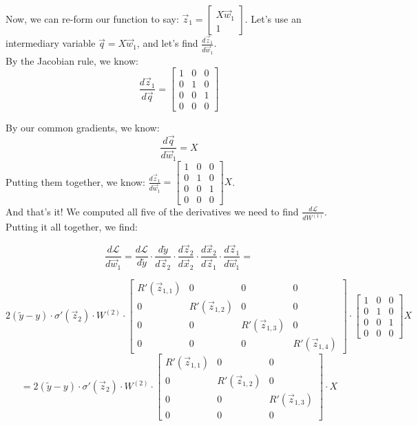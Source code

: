 \documentclass{article}
\begin{document}
Now, we can re-form our function to say: $\vec{z}_1 = \begin{bmatrix}X \vec{w}_1 \\ 1\end{bmatrix}$. Let's use an intermediary variable $\vec{q} = X \vec{w}_1$, and let's find $\frac{d\vec{z}_1}{d\vec{w}_1}$. \\

By the Jacobian rule, we know: $$\frac{d \vec{z}_1}{d \vec{q}} = \begin{bmatrix} 1 & 0 & 0 \\ 0 & 1 & 0 \\ 0 & 0 & 1 \\ 0 & 0 & 0\end{bmatrix}$$

By our common gradients, we know: $$\frac{d \vec{q}}{d \vec{w}_1} = X$$ Putting them together, we know:
$\frac{d \vec{z}_1}{d \vec{w}_1} = \begin{bmatrix} 1 & 0 & 0 \\ 0 & 1 & 0 \\ 0 & 0 & 1 \\ 0 & 0 & 0\end{bmatrix} X$. \\

And that's it! We computed all five of the derivatives we need to find $\frac{d \mathcal{L}}{d W^{(1)}}$. Putting it all together, we find:

\[\frac{d\mathcal{L}}{d \vec{w}_1} = \frac{d\mathcal{L}}{d \tilde{y}} \cdot \frac{d\tilde{y}}{d\vec{z}_2} \cdot \frac{d\vec{z}_2}{d \vec{x}_2} \cdot \frac{d\vec{x}_2}{d\vec{z}_1}\cdot \frac{d\vec{z}_1}{d \vec{w}_1} = \] 

\[2 (\tilde{y} - y) \cdot \sigma'(\vec{z}_2) \cdot W^{(2)} \cdot \begin{bmatrix}R'(\vec{z}_{1, 1}) & 0 & 0 & 0 \\
0 & R'(\vec{z}_{1, 2}) & 0 & 0 \\
0 & 0 & R'(\vec{z}_{1, 3}) & 0 \\
0 & 0 & 0 & R'(\vec{z}_{1, 4})
\end{bmatrix}\cdot \begin{bmatrix} 1 & 0 & 0 \\ 0 & 1 & 0 \\ 0 & 0 & 1 \\ 0 & 0 & 0\end{bmatrix} X\]
\[ = 2 (\tilde{y} - y) \cdot \sigma'(\vec{z}_2) \cdot W^{(2)} \cdot \begin{bmatrix}R'(\vec{z}_{1, 1}) & 0 & 0 \\
0 & R'(\vec{z}_{1, 2}) & 0  \\
0 & 0 & R'(\vec{z}_{1, 3})  \\
0 & 0 & 0 
\end{bmatrix}\cdot X\]
\end{document}
